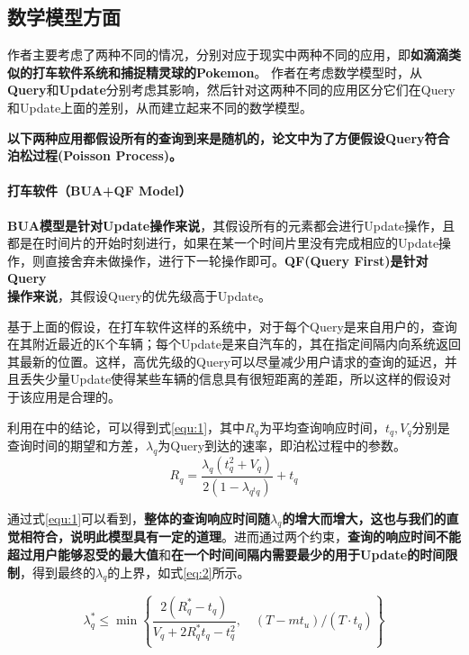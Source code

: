 \documentclass{ML}
\begin{document}
\subsection{数学模型方面}
作者主要考虑了两种不同的情况，分别对应于现实中两种不同的应用，即\textbf{如滴滴类似的打车软件系统和捕捉精灵球的Pokemon}。 作者在考虑数学模型时，从\textbf{Query}和\textbf{Update}分别考虑其影响，然后针对这两种不同的应用区分它们在Query和Update上面的差别，从而建立起来不同的数学模型。

\textbf{以下两种应用都假设所有的查询到来是随机的，论文中为了方便假设Query符合泊松过程(Poisson Process)。}
\paragraph{打车软件（BUA+QF Model）}
\textbf{BUA模型是针对Update操作来说}，其假设所有的元素都会进行Update操作，且都是在时间片的开始时刻进行，如果在某一个时间片里没有完成相应的Update操作，则直接舍弃未做操作，进行下一轮操作即可。\textbf{QF(Query First)是针对Query\\操作来说}，其假设Query的优先级高于Update。

基于上面的假设，在打车软件这样的系统中，对于每个Query是来自用户的，查询在其附近最近的K个车辆；每个Update是来自汽车的，其在指定间隔内向系统返回其最新的位置。这样，高优先级的Query可以尽量减少用户请求的查询的延迟，并且丢失少量Update使得某些车辆的信息具有很短距离的差距，所以这样的假设对于该应用是合理的。

利用在\cite{single-server-queue}中的结论，可以得到式\eqref{equ:1}，其中$R_q$为平均查询响应时间，$t_q, V_{q}$分别是查询时间的期望和方差，$\lambda_{q}$为Query到达的速率，即泊松过程中的参数。
\begin{equation}
R_{q}=\frac{\lambda_{q}\left(t_{q}^{2}+V_{q}\right)}{2\left(1-\lambda_{q^{t} q}\right)}+t_{q}
\label{equ:1}
\end{equation}

通过式\eqref{equ:1}可以看到，\textbf{整体的查询响应时间随$\lambda_{q}$的增大而增大，这也与我们的直觉相符合，说明此模型具有一定的道理}。进而通过两个约束，\textbf{查询的响应时间不能超过用户能够忍受的最大值}和\textbf{在一个时间间隔内需要最少的用于Update的时间限制}，得到最终的$\lambda_{q}$的上界，如式\eqref{eq:2}所示。

\begin{equation}
\lambda_{q}^{*} \leq \min \left\{\frac{2\left(R_{q}^{*}-t_{q}\right)}{V_{q}+2 R_{q}^{*} t_{q}-t_{q}^{2}}, \quad\left(T-m t_{u}\right) /\left(T \cdot t_{q}\right)\right\}
\label{eq:2}
\end{equation}
\end{document}
